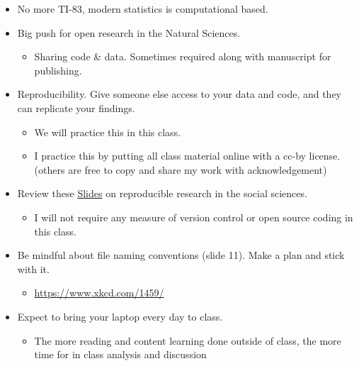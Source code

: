 \documentclass[]{article}
\providecommand{\tightlist}{%
  \setlength{\itemsep}{0pt}\setlength{\parskip}{0pt}}
\begin{document}
\begin{itemize}
\tightlist
\item
  No more TI-83, modern statistics is computational based.
\item
  Big push for open research in the Natural Sciences.

  \begin{itemize}
  \tightlist
  \item
    Sharing code \& data. Sometimes required along with manuscript for
    publishing.
  \end{itemize}
\item
  Reproducibility. Give someone else access to your data and code, and
  they can replicate your findings.

  \begin{itemize}
  \tightlist
  \item
    We will practice this in this class.
  \item
    I practice this by putting all class material online with a cc-by
    license. (others are free to copy and share my work with
    acknowledgement)
  \end{itemize}
\item
  Review these
  \href{http://benmarwick.github.io/UW-eScience-reproducibility-social-sciences/\#/}{Slides}
  on reproducible research in the social sciences.

  \begin{itemize}
  \tightlist
  \item
    I will not require any measure of version control or open source
    coding in this class.
  \end{itemize}
\item
  Be mindful about file naming conventions (slide 11). Make a plan and
  stick with it.

  \begin{itemize}
  \tightlist
  \item
    \url{https://www.xkcd.com/1459/}
  \end{itemize}
\item
  Expect to bring your laptop every day to class.

  \begin{itemize}
  \tightlist
  \item
    The more reading and content learning done outside of class, the
    more time for in class analysis and discussion
  \end{itemize}
\end{itemize}
\end{document}

